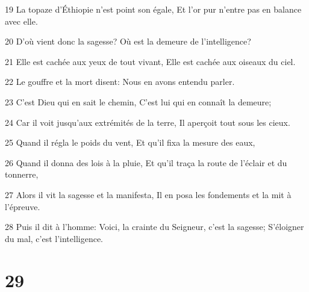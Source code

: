 \par 19 La topaze d'Éthiopie n'est point son égale, Et l'or pur n'entre pas en balance avec elle.
\par 20 D'où vient donc la sagesse? Où est la demeure de l'intelligence?
\par 21 Elle est cachée aux yeux de tout vivant, Elle est cachée aux oiseaux du ciel.
\par 22 Le gouffre et la mort disent: Nous en avons entendu parler.
\par 23 C'est Dieu qui en sait le chemin, C'est lui qui en connaît la demeure;
\par 24 Car il voit jusqu'aux extrémités de la terre, Il aperçoit tout sous les cieux.
\par 25 Quand il régla le poids du vent, Et qu'il fixa la mesure des eaux,
\par 26 Quand il donna des lois à la pluie, Et qu'il traça la route de l'éclair et du tonnerre,
\par 27 Alors il vit la sagesse et la manifesta, Il en posa les fondements et la mit à l'épreuve.
\par 28 Puis il dit à l'homme: Voici, la crainte du Seigneur, c'est la sagesse; S'éloigner du mal, c'est l'intelligence.

\chapter{29}


